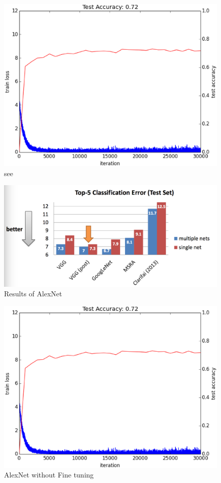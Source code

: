 \documentclass{article}
\begin{document}
\begin{figure}
	\centering
	\includegraphics[width=0.9\columnwidth]{depnet1}
	\caption{see}
	\label{fig:4}
\end{figure}
\begin{figure}[b!]
	\centering
	\includegraphics[width=0.9\columnwidth]{figure_2}
	\caption{Results of AlexNet}
	\label{fig:5}
\end{figure}
\begin{figure}[b!]
	\centering
	\includegraphics[width=0.9\columnwidth]{depnet1}
	\caption{AlexNet without Fine tuning}
	\label{fig:6}
\end{figure}
\end{document}
